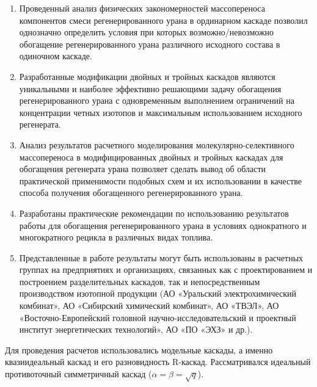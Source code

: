 {\influence} 
\begin{enumerate}
  \item Проведенный анализ физических закономерностей массопереноса компонентов смеси регенерированного урана в ординарном каскаде позволил однозначно определить условия при которых возможно/невозможно обогащение регенерированного урана различного исходного состава в одиночном каскаде.
  \item Разработанные модификации двойных и тройных каскадов являются уникальными и наиболее эффективно решающими задачу обогащения регенерированного урана с одновременным выполнением ограничений на концентрации четных изотопов и максимальным использованием исходного регенерата.
  \item Анализ результатов расчетного моделирования молекулярно-селективного массопереноса в модифицированных двойных и тройных каскадах для обогащения регенерата урана позволяет сделать вывод об области практической применимости подобных схем и их использовании в качестве способа получения обогащенного регенерированного урана.
  \item Разработаны практические рекомендации по использованию результатов работы для обогащения регенерированного урана в условиях однократного и многократного рецикла в различных видах топлива.
  \item  Представленные в работе результаты могут быть использованы в расчетных группах на предприятиях и организациях, связанных как с проектированием и построением разделительных каскадов, так и непосредственным производством изотопной продукции (АО «Уральский электрохимический комбинат», АО «Сибирский химический комбинат», АО «ТВЭЛ», АО «Восточно-Европейский головной научно-исследовательский и проектный институт энергетических технологий», АО «ПО «ЭХЗ» и др.).
\end{enumerate}

{\methods} Для проведения расчетов использовались модельные каскады, а именно квазиидеальный каскад и его разновидность R-каскад. Рассматривался идеальный противоточный симметричный каскад ($\alpha=\beta=\sqrt{q}$).

